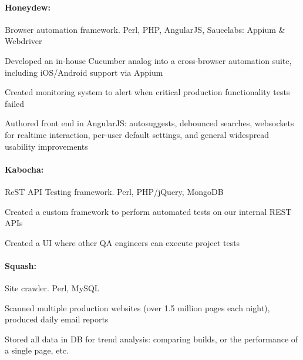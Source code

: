\begin{position}

  \paragraph{Honeydew:} Browser automation framework. Perl, PHP, AngularJS, Saucelabs: Appium \& Webdriver
  \begin{myitem}
  \item Developed an in-house Cucumber analog into a cross-browser automation suite, including iOS/Android support via Appium
  \item Created monitoring system to alert when critical production functionality tests failed
  \item Authored front end in AngularJS: autosuggests, debounced searches, websockets for realtime interaction, per-user default settings, and general widespread usability improvements
  \end{myitem}
  \paragraph{Kabocha:} ReST API Testing framework. Perl, PHP/jQuery, MongoDB
  \begin{myitem}
  \item Created a custom framework to perform automated tests on our internal REST APIs
  \item Created a UI where other QA engineers can execute project tests
  \end{myitem}

  \paragraph{Squash:} Site crawler. Perl, MySQL
  \begin{myitem}
  \item Scanned multiple production websites (over 1.5 million pages each night), produced daily email reports
  \item Stored all data in DB for trend analysis: comparing builds, or the performance of a single page, etc.
  \end{myitem}

\end{position}
